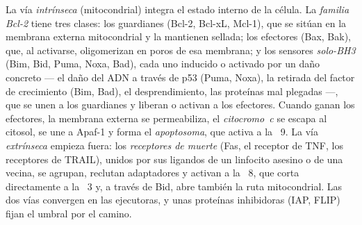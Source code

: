 \begin{definition}\label{def:b3:cell-cycle-apoptosis:pathways}
La vía \emph{intrínseca} (mitocondrial) integra el estado interno de la
célula. La \emph{familia Bcl-2} tiene tres clases: los guardianes
(Bcl-2, Bcl-xL, Mcl-1), que se sitúan en la membrana externa mitocondrial
y la mantienen sellada; los efectores (Bax, Bak), que, al activarse,
oligomerizan en poros de esa membrana; y los sensores \emph{solo-BH3}
(Bim, Bid, Puma, Noxa, Bad), cada uno inducido o activado por un daño
concreto --- el daño del ADN a través de p53 (Puma, Noxa), la retirada
del factor de crecimiento (Bim, Bad), el desprendimiento, las proteínas
mal plegadas ---, que se unen a los guardianes y liberan o activan a los
efectores. Cuando ganan los efectores, la membrana externa se
permeabiliza, el \emph{citocromo~c} se escapa al citosol, se une a Apaf-1
y forma el \emph{apoptosoma}, que activa a la ~9. La vía
\emph{extrínseca} empieza fuera: los \emph{receptores de muerte} (Fas, el
receptor de TNF, los receptores de TRAIL), unidos por sus ligandos de un
linfocito asesino o de una vecina, se agrupan, reclutan adaptadores y
activan a la ~8, que corta directamente a la ~3 y, a través
de Bid, abre también la ruta mitocondrial. Las dos vías convergen en las
 ejecutoras, y unas proteínas inhibidoras (IAP, FLIP) fijan el
umbral por el camino.
\end{definition}

